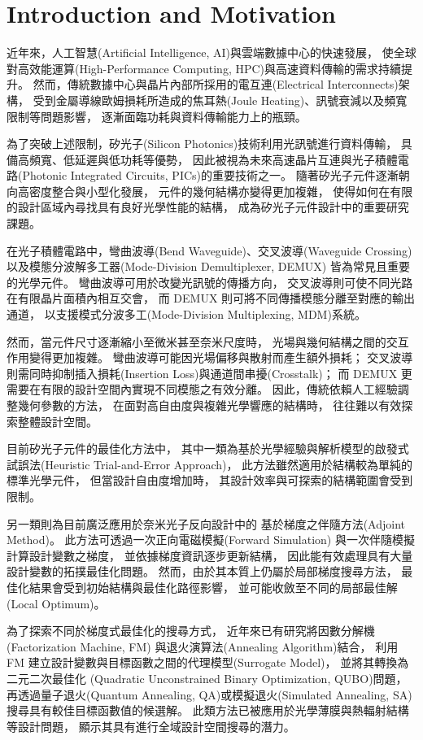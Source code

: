 \chapter{Introduction and Motivation}
\label{ch:intro}

近年來，人工智慧(Artificial Intelligence, AI)與雲端數據中心的快速發展，
使全球對高效能運算(High-Performance Computing, HPC)與高速資料傳輸的需求持續提升。
然而，傳統數據中心與晶片內部所採用的電互連(Electrical Interconnects)架構，
受到金屬導線歐姆損耗所造成的焦耳熱(Joule Heating)、訊號衰減以及頻寬限制等問題影響，
逐漸面臨功耗與資料傳輸能力上的瓶頸。

為了突破上述限制，矽光子(Silicon Photonics)技術利用光訊號進行資料傳輸，
具備高頻寬、低延遲與低功耗等優勢，
因此被視為未來高速晶片互連與光子積體電路(Photonic Integrated Circuits, PICs)的重要技術之一。
隨著矽光子元件逐漸朝向高密度整合與小型化發展，
元件的幾何結構亦變得更加複雜，
使得如何在有限的設計區域內尋找具有良好光學性能的結構，
成為矽光子元件設計中的重要研究課題。

在光子積體電路中，彎曲波導(Bend Waveguide)、交叉波導(Waveguide Crossing)
以及模態分波解多工器(Mode-Division Demultiplexer, DEMUX)
皆為常見且重要的光學元件。
彎曲波導可用於改變光訊號的傳播方向，
交叉波導則可使不同光路在有限晶片面積內相互交會，
而 DEMUX 則可將不同傳播模態分離至對應的輸出通道，
以支援模式分波多工(Mode-Division Multiplexing, MDM)系統。

然而，當元件尺寸逐漸縮小至微米甚至奈米尺度時，
光場與幾何結構之間的交互作用變得更加複雜。
彎曲波導可能因光場偏移與散射而產生額外損耗；
交叉波導則需同時抑制插入損耗(Insertion Loss)與通道間串擾(Crosstalk)；
而 DEMUX 更需要在有限的設計空間內實現不同模態之有效分離。
因此，傳統依賴人工經驗調整幾何參數的方法，
在面對高自由度與複雜光學響應的結構時，
往往難以有效探索整體設計空間。

目前矽光子元件的最佳化方法中，
其中一類為基於光學經驗與解析模型的啟發式試誤法(Heuristic Trial-and-Error Approach)，
此方法雖然適用於結構較為單純的標準光學元件，
但當設計自由度增加時，
其設計效率與可探索的結構範圍會受到限制。

另一類則為目前廣泛應用於奈米光子反向設計中的
基於梯度之伴隨方法(Adjoint Method)。
此方法可透過一次正向電磁模擬(Forward Simulation)
與一次伴隨模擬計算設計變數之梯度，
並依據梯度資訊逐步更新結構，
因此能有效處理具有大量設計變數的拓撲最佳化問題。
然而，由於其本質上仍屬於局部梯度搜尋方法，
最佳化結果會受到初始結構與最佳化路徑影響，
並可能收斂至不同的局部最佳解(Local Optimum)。

為了探索不同於梯度式最佳化的搜尋方式，
近年來已有研究將因數分解機(Factorization Machine, FM)
與退火演算法(Annealing Algorithm)結合，
利用 FM 建立設計變數與目標函數之間的代理模型(Surrogate Model)，
並將其轉換為二元二次最佳化
(Quadratic Unconstrained Binary Optimization, QUBO)問題，
再透過量子退火(Quantum Annealing, QA)或模擬退火(Simulated Annealing, SA)
搜尋具有較佳目標函數值的候選解。
此類方法已被應用於光學薄膜與熱輻射結構等設計問題，
顯示其具有進行全域設計空間搜尋的潛力。

